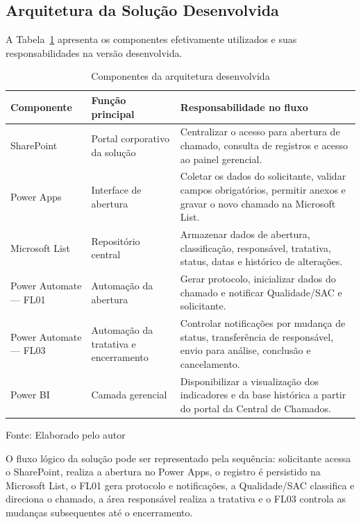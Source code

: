 \subsection{Arquitetura da Solução Desenvolvida}

A Tabela~\ref{tab:arquitetura-desenvolvida} apresenta os
componentes efetivamente utilizados e suas responsabilidades
na versão desenvolvida.

\begin{table}[H]
\caption{Componentes da arquitetura desenvolvida}
\label{tab:arquitetura-desenvolvida}
\centering
\begin{tabular}{p{3.0cm} p{4.1cm} p{5.1cm}}
\hline
\textbf{Componente} & \textbf{Função principal} &
\textbf{Responsabilidade no fluxo} \\
\hline
SharePoint &
Portal corporativo da solução &
Centralizar o acesso para abertura de chamado, consulta de
registros e acesso ao painel gerencial. \\
\hline
Power Apps &
Interface de abertura &
Coletar os dados do solicitante, validar campos
obrigatórios, permitir anexos e gravar o novo chamado na
Microsoft List. \\
\hline
Microsoft List &
Repositório central &
Armazenar dados de abertura, classificação, responsável,
tratativa, status, datas e histórico de alterações. \\
\hline
Power Automate --- FL01 &
Automação da abertura &
Gerar protocolo, inicializar dados do chamado e notificar
Qualidade/SAC e solicitante. \\
\hline
Power Automate --- FL03 &
Automação da tratativa e encerramento &
Controlar notificações por mudança de status, transferência
de responsável, envio para análise, conclusão e
cancelamento. \\
\hline
Power BI &
Camada gerencial &
Disponibilizar a visualização dos indicadores e da base
histórica a partir do portal da Central de Chamados. \\
\hline
\end{tabular}
\raggedright
\par
{\fontsize{10}{12}\selectfont Fonte: Elaborado pelo autor}
\end{table}

O fluxo lógico da solução pode ser representado pela
sequência: solicitante acessa o SharePoint, realiza a
abertura no Power Apps, o registro é persistido na
Microsoft List, o FL01 gera protocolo e notificações, a
Qualidade/SAC classifica e direciona o chamado, a área
responsável realiza a tratativa e o FL03 controla as
mudanças subsequentes até o encerramento.


